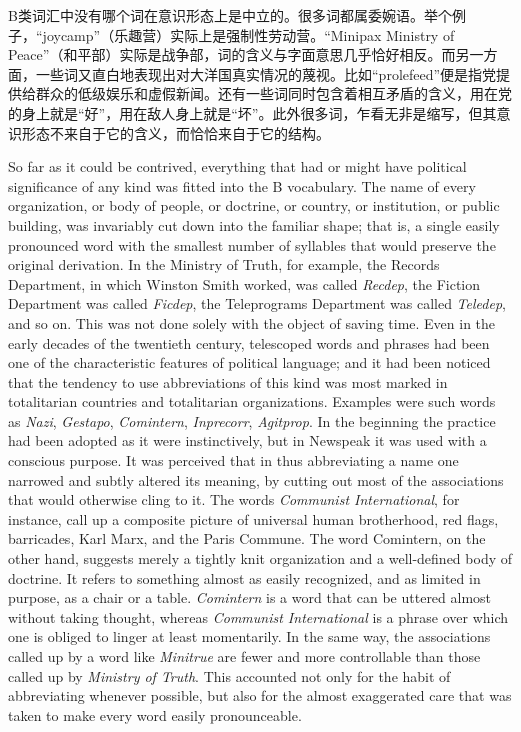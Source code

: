 \begin{paracol}{2}
\switchcolumn

B类词汇中没有哪个词在意识形态上是中立的。很多词都属委婉语。举个例子，``joycamp''（乐趣营）实际上是强制性劳动营。``Minipax
Ministry of
Peace''（和平部）实际是战争部，词的含义与字面意思几乎恰好相反。而另一方面，一些词又直白地表现出对大洋国真实情况的蔑视。比如``prolefeed''便是指党提供给群众的低级娱乐和虚假新闻。还有一些词同时包含着相互矛盾的含义，用在党的身上就是``好''，用在敌人身上就是``坏''。此外很多词，乍看无非是缩写，但其意识形态不来自于它的含义，而恰恰来自于它的结构。

\switchcolumn*

So far as it could be contrived, everything that had or might have
political significance of any kind was fitted into the B vocabulary. The
name of every organization, or body of people, or doctrine, or country,
or institution, or public building, was invariably cut down into the
familiar shape; that is, a single easily pronounced word with the
smallest number of syllables that would preserve the original
derivation. In the Ministry of Truth, for example, the Records
Department, in which Winston Smith worked, was called \emph{Recdep}, the
Fiction Department was called \emph{Ficdep}, the Teleprograms Department
was called \emph{Teledep}, and so on. This was not done solely with the
object of saving time. Even in the early decades of the twentieth
century, telescoped words and phrases had been one of the characteristic
features of political language; and it had been noticed that the
tendency to use abbreviations of this kind was most marked in
totalitarian countries and totalitarian organizations. Examples were
such words as \emph{Nazi}, \emph{Gestapo}, \emph{Comintern},
\emph{Inprecorr}, \emph{Agitprop}. In the beginning the practice had
been adopted as it were instinctively, but in Newspeak it was used with
a conscious purpose. It was perceived that in thus abbreviating a name
one narrowed and subtly altered its meaning, by cutting out most of the
associations that would otherwise cling to it. The words \emph{Communist
International}, for instance, call up a composite picture of universal
human brotherhood, red flags, barricades, Karl Marx, and the Paris
Commune. The word Comintern, on the other hand, suggests merely a
tightly knit organization and a well-defined body of doctrine. It refers
to something almost as easily recognized, and as limited in purpose, as
a chair or a table. \emph{Comintern} is a word that can be uttered
almost without taking thought, whereas \emph{Communist International} is
a phrase over which one is obliged to linger at least momentarily. In
the same way, the associations called up by a word like \emph{Minitrue}
are fewer and more controllable than those called up by \emph{Ministry
of Truth}. This accounted not only for the habit of abbreviating
whenever possible, but also for the almost exaggerated care that was
taken to make every word easily pronounceable.


\end{paracol}
